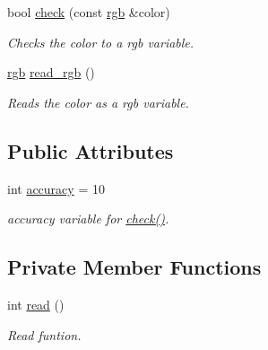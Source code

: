 \begin{DoxyCompactItemize}
bool \hyperlink{classtcs3200_ae3eef94d71082b2076be2d600bd3f3fb}{check} (const \hyperlink{structrgb}{rgb} \&color)
\begin{DoxyCompactList}\small\item\em Checks the color to a rgb variable. \end{DoxyCompactList}\item 
\hyperlink{structrgb}{rgb} \hyperlink{classtcs3200_ad2d5daf026a53178ea90f62f7f8b0adb}{read\+\_\+rgb} ()
\begin{DoxyCompactList}\small\item\em Reads the color as a rgb variable. \end{DoxyCompactList}\end{DoxyCompactItemize}
\subsection*{Public Attributes}
\begin{DoxyCompactItemize}
\item 
\mbox{\label{classtcs3200_a1fb089f013074ad2adba1eeb916350db}} 
int \hyperlink{classtcs3200_a1fb089f013074ad2adba1eeb916350db}{accuracy} = 10
\begin{DoxyCompactList}\small\item\em accuracy variable for \hyperlink{classtcs3200_ae3eef94d71082b2076be2d600bd3f3fb}{check()}. \end{DoxyCompactList}\end{DoxyCompactItemize}
\subsection*{Private Member Functions}
\begin{DoxyCompactItemize}
\item 
int \hyperlink{classtcs3200_a02b9d9553e97b38bd3aab87bc5ea84b2}{read} ()
\begin{DoxyCompactList}\small\item\em Read funtion. \end{DoxyCompactList}\end{DoxyCompactItemize}
